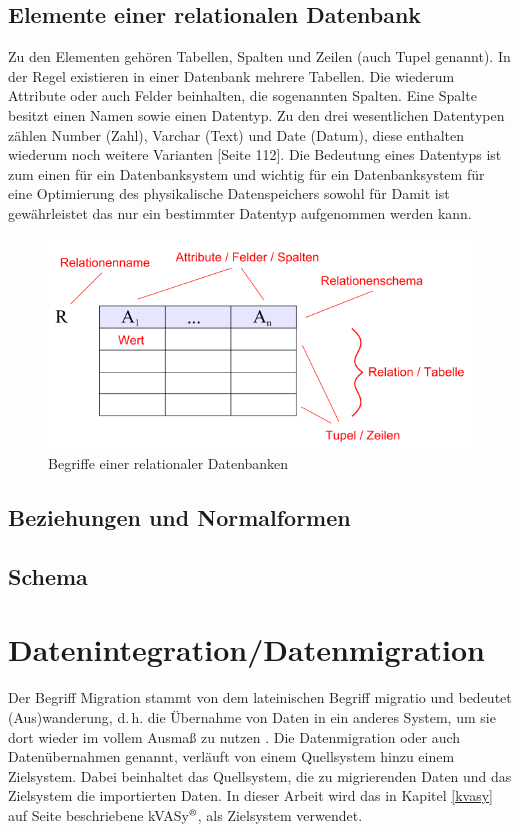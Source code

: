 \subsection{Elemente einer relationalen Datenbank}
Zu den Elementen gehören Tabellen, Spalten und Zeilen (auch Tupel genannt). In der Regel existieren in einer Datenbank mehrere Tabellen. Die wiederum Attribute oder auch Felder beinhalten, die sogenannten Spalten. Eine Spalte besitzt einen Namen sowie einen Datentyp. Zu den drei wesentlichen Datentypen zählen Number (Zahl), Varchar (Text) und Date (Datum), diese enthalten wiederum noch weitere Varianten \cite{Kemper2011}[Seite 112]. Die Bedeutung eines Datentyps ist zum einen für ein Datenbanksystem und wichtig für ein Datenbanksystem für eine Optimierung des physikalische Datenspeichers sowohl für Damit ist gewährleistet das nur ein bestimmter Datentyp aufgenommen werden kann. 


\begin{figure}[ht]
	\begin{center}
		\includegraphics[scale=0.5]{bilder/Begriffe_relationaler_Datenbanken.png}
		\caption{Begriffe einer relationaler Datenbanken \cite{wiki:rdb}}
		\label{pic:RDB:end}
	\end{center}
\end{figure}


\subsection{Beziehungen und Normalformen}
\subsection{Schema}

\section{Datenintegration/Datenmigration}
Der Begriff Migration stammt von dem lateinischen Begriff migratio und bedeutet (Aus)wanderung, d.\,h. die Übernahme von
Daten in ein anderes System, um sie dort wieder im vollem Ausmaß zu nutzen \cite{duden:migra}.
Die Datenmigration oder auch Datenübernahmen genannt, verläuft von einem Quellsystem hinzu einem Zielsystem. Dabei beinhaltet das Quellsystem, die zu migrierenden Daten und das Zielsystem die importierten Daten. In dieser Arbeit wird das in Kapitel \ref{kvasy} auf Seite \pageref{kvasy} beschriebene kVASy$^\text{\textregistered}$, als Zielsystem verwendet. 

